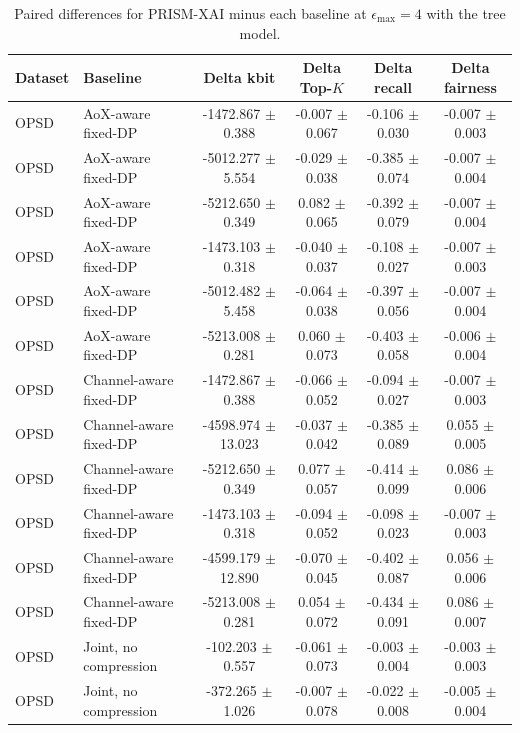 \begin{table}[t]
\caption{Paired differences for PRISM-XAI minus each baseline at $\epsilon_{\max}=4$ with the tree model.}
\label{tab:paired-differences}
\centering
\scriptsize
\setlength{\tabcolsep}{3pt}
\begin{tabular}{llcccc}
\toprule
Dataset & Baseline & Delta kbit & Delta Top-$K$ & Delta recall & Delta fairness \\
\midrule
OPSD & AoX-aware fixed-DP & -1472.867 $\pm$ 0.388 & -0.007 $\pm$ 0.067 & -0.106 $\pm$ 0.030 & -0.007 $\pm$ 0.003 \\
OPSD & AoX-aware fixed-DP & -5012.277 $\pm$ 5.554 & -0.029 $\pm$ 0.038 & -0.385 $\pm$ 0.074 & -0.007 $\pm$ 0.004 \\
OPSD & AoX-aware fixed-DP & -5212.650 $\pm$ 0.349 & 0.082 $\pm$ 0.065 & -0.392 $\pm$ 0.079 & -0.007 $\pm$ 0.004 \\
OPSD & AoX-aware fixed-DP & -1473.103 $\pm$ 0.318 & -0.040 $\pm$ 0.037 & -0.108 $\pm$ 0.027 & -0.007 $\pm$ 0.003 \\
OPSD & AoX-aware fixed-DP & -5012.482 $\pm$ 5.458 & -0.064 $\pm$ 0.038 & -0.397 $\pm$ 0.056 & -0.007 $\pm$ 0.004 \\
OPSD & AoX-aware fixed-DP & -5213.008 $\pm$ 0.281 & 0.060 $\pm$ 0.073 & -0.403 $\pm$ 0.058 & -0.006 $\pm$ 0.004 \\
OPSD & Channel-aware fixed-DP & -1472.867 $\pm$ 0.388 & -0.066 $\pm$ 0.052 & -0.094 $\pm$ 0.027 & -0.007 $\pm$ 0.003 \\
OPSD & Channel-aware fixed-DP & -4598.974 $\pm$ 13.023 & -0.037 $\pm$ 0.042 & -0.385 $\pm$ 0.089 & 0.055 $\pm$ 0.005 \\
OPSD & Channel-aware fixed-DP & -5212.650 $\pm$ 0.349 & 0.077 $\pm$ 0.057 & -0.414 $\pm$ 0.099 & 0.086 $\pm$ 0.006 \\
OPSD & Channel-aware fixed-DP & -1473.103 $\pm$ 0.318 & -0.094 $\pm$ 0.052 & -0.098 $\pm$ 0.023 & -0.007 $\pm$ 0.003 \\
OPSD & Channel-aware fixed-DP & -4599.179 $\pm$ 12.890 & -0.070 $\pm$ 0.045 & -0.402 $\pm$ 0.087 & 0.056 $\pm$ 0.006 \\
OPSD & Channel-aware fixed-DP & -5213.008 $\pm$ 0.281 & 0.054 $\pm$ 0.072 & -0.434 $\pm$ 0.091 & 0.086 $\pm$ 0.007 \\
OPSD & Joint, no compression & -102.203 $\pm$ 0.557 & -0.061 $\pm$ 0.073 & -0.003 $\pm$ 0.004 & -0.003 $\pm$ 0.003 \\
OPSD & Joint, no compression & -372.265 $\pm$ 1.026 & -0.007 $\pm$ 0.078 & -0.022 $\pm$ 0.008 & -0.005 $\pm$ 0.004 \\

\end{tabular}
\end{table}
